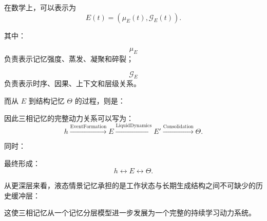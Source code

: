 在数学上，可以表示为
\[
\boxed{
E(t)
=
\left(
\mu_E(t),
\mathcal{G}_E(t)
\right).
}
\]

其中：

\[
\mu_E
\]
负责表示记忆强度、蒸发、凝聚和碎裂；

\[
\mathcal{G}_E
\]
负责表示时序、因果、上下文和层级关系。

而从 $E$ 到结构记忆 $\Theta$ 的过程，则是：
\begin{statementbox}
\centering
{}
\end{statementbox}

因此三相记忆的完整动力关系可以写为：
\[
\boxed{
h
\xrightarrow{
\mathrm{EventFormation}
}
E
\xrightarrow{
\mathrm{LiquidDynamics}
}
E'
\xrightarrow{
\mathrm{Consolidation}
}
\Theta.
}
\]

同时：
\begin{statementbox}
\centering
{}
\end{statementbox}

最终形成：
\[
\boxed{
h
\leftrightarrow
E
\leftrightarrow
\Theta.
}
\]

从更深层来看，液态情景记忆承担的是工作状态与长期生成结构之间不可缺少的历史缓冲层：

\begin{statementbox}
\centering
{}
\end{statementbox}

这使三相记忆从一个记忆分层模型进一步发展为一个完整的持续学习动力系统。